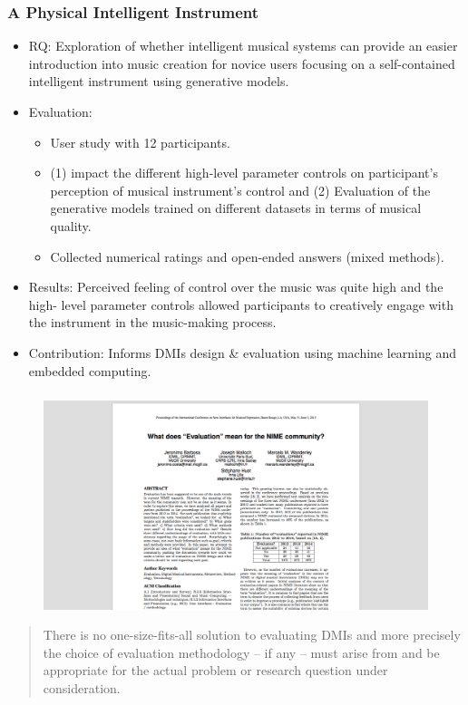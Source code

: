 \documentclass[screen, aspectratio=169]{beamer}
\begin{document}
\begin{frame}
\frametitle{A Physical Intelligent Instrument}	
\begin{itemize}
\item RQ: Exploration of whether intelligent musical systems can provide an easier introduction into music creation for novice users focusing on a self-contained intelligent instrument using generative models.
\item Evaluation:
\begin{itemize}
\item User study with 12 participants.
\item (1) impact the different high-level parameter controls on participant's perception of musical instrument's control and (2) Evaluation of the generative models trained on different datasets in terms of musical quality.
\item Collected numerical ratings and open-ended answers (mixed methods).
\end{itemize}
\item Results: Perceived feeling of control over the music was quite high and the high- level parameter controls allowed participants to creatively engage with the instrument in the music-making process.
\item Contribution: Informs DMIs design \& evaluation using machine learning and embedded computing.
\end{itemize}
\end{frame}
%
\begin{frame}
\frametitle{}
 \begin{figure}
	\includegraphics[scale=0.25]{img/Barbosa-et-al-2015.png}
    \end{figure}	
\begin{quote}There is no one-size-fits-all solution to evaluating DMIs and more precisely the choice of evaluation methodology -- if any -- must arise from and be appropriate for the actual problem or research question under consideration. \cite[p.161]{Barbosa.et.al.2015.evaluationNIME}
\end{quote}
\end{frame}
\end{document}
